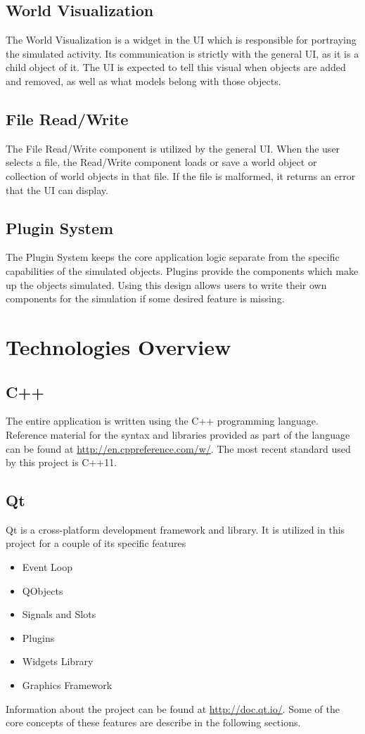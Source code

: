 \subsection{World Visualization}
The World Visualization is a widget in the UI which is responsible for portraying the simulated activity. Its communication is strictly with the general UI, as it is a child object of it. The UI is expected to tell this visual when objects are added and removed, as well as what models belong with those objects.

\subsection{File Read/Write}
The File Read/Write component is utilized by the general UI. When the user selects a file, the Read/Write component loads or save a world object or collection of world objects in that file. If the file is malformed, it returns an error that the UI can display.

\subsection{Plugin System}
The Plugin System keeps the core application logic separate from the specific capabilities of the simulated objects. Plugins provide the components which make up the objects simulated. Using this design allows users to write their own components for the simulation if some desired feature is missing.

\section{Technologies Overview}
\subsection{C++}
	The entire application is written using the C++ programming language. Reference material for the syntax and libraries provided as part of the language can be found at \url{http://en.cppreference.com/w/}. The most recent standard used by this project is C++11.
	
\subsection{Qt}
	Qt is a cross-platform development framework and library. It is utilized in this project for a couple of its specific features
	\begin{itemize}
		\item Event Loop
		\item QObjects
		\item Signals and Slots
		\item Plugins
		\item Widgets Library
		\item Graphics Framework
	\end{itemize}
	Information about the project can be found at \url{http://doc.qt.io/}. Some of the core concepts of these features are describe in the following sections.
	
